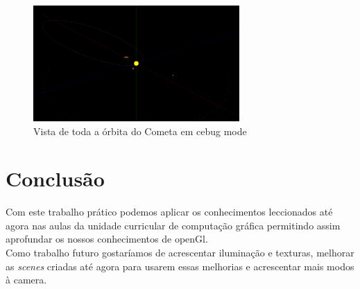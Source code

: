 \documentclass[a4paper]{report}
\begin{document}
\begin{figure}[H]
    \centering 
    \includegraphics[width=0.7\textwidth]{images/all_view_debug.png}  
    \caption{Vista de toda a órbita do Cometa em cebug mode}
\end{figure}

\chapter{Conclusão}
Com este trabalho prático podemos aplicar os conhecimentos leccionados até agora
nas aulas da unidade curricular de computação gráfica permitindo assim
aprofundar os nossos conhecimentos de openGl.\\
Como trabalho futuro gostaríamos de acrescentar iluminação e texturas, melhorar
as \textit{scenes} criadas até agora para usarem essas melhorias e acrescentar
mais modos à camera.
\end{document}
